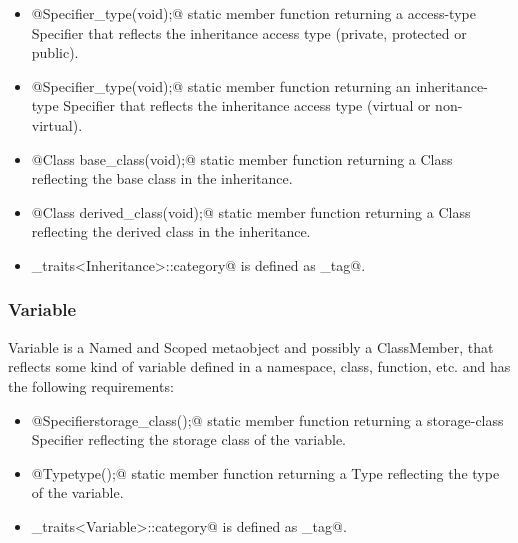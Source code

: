 \begin{itemize}
	\item{\verb@static @{\metaobject Specifier}\verb@access_type(void);@} static member function
	returning a access-type {\metaobject Specifier} that reflects the inheritance access type
	(private, protected or public).

	\item{\verb@static @{\metaobject Specifier}\verb@inheritance_type(void);@} static member function
	returning an inheritance-type {\metaobject Specifier} that reflects the inheritance access type
	(virtual or non-virtual).

	\item{\verb@static @{\metaobject Class} \verb@ base_class(void);@} static member function
	returning a {\metaobject Class} reflecting the base class in the inheritance.

	\item{\verb@static @{\metaobject Class} \verb@ derived_class(void);@} static member function
	returning a {\metaobject Class} reflecting the derived class in the inheritance.

	\item \verb@metaobject_traits<Inheritance>::category@ is defined as \verb@inheritance_tag@.
\end{itemize}

\subsubsection{Variable}

{\metaobject Variable} is a {\metaobject Named} and {\metaobject Scoped} metaobject and possibly a
{\metaobject ClassMember}, that reflects some kind of variable defined in a namespace, class, function, etc.
and has the following requirements:

\begin{itemize}
	\item{\verb@static @{\metaobject Specifier}\verb@ storage_class();@} static member function returning
	a storage-class {\metaobject Specifier} reflecting the storage class of the variable.

	\item{\verb@static @{\metaobject Type}\verb@ type();@} static member function returning
	a {\metaobject Type} reflecting the type of the variable.

	\item \verb@metaobject_traits<Variable>::category@ is defined as \verb@variable_tag@.
\end{itemize}

